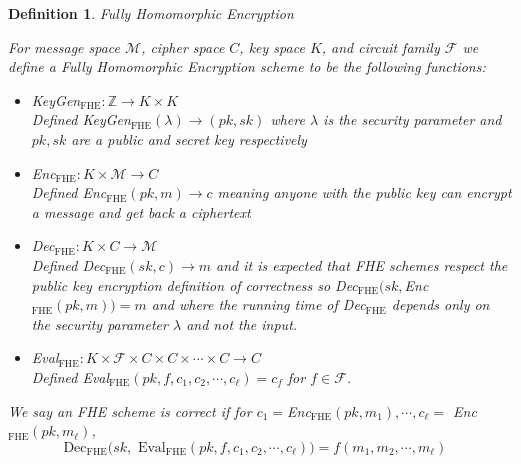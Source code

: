 \documentclass[12pt,twoside]{reedthesis}
\newtheorem{definition}{Definition}
\newcommand{\dec}[0]{\text{Dec}}
\newcommand{\Z}[0]{\mathbb{Z}}
\begin{document}
    \begin{definition}{Fully Homomorphic Encryption}
    \par For message space $\mathcal{M}$, cipher space $C$, key space $K$, and circuit family $\mathcal{F}$ we define a Fully Homomorphic Encryption scheme to be the following functions:
     
     \newcommand{\fhe}[0]{_\text{FHE}}
     
     \begin{itemize}
     \item KeyGen$_\text{FHE}:\Z \to K \times K$ \\
     Defined KeyGen$_\text{FHE}(\lambda)\to (pk,sk)$ where $\lambda$ is the security parameter and $pk,sk$ are a public and secret key respectively 
     \item Enc$_\text{FHE}:K \times \mathcal{M}\to C$ \\
     Defined Enc$_\text{FHE}(pk,m) \to c$ meaning anyone with the public key can encrypt a message and get back a ciphertext
     \item Dec$_\text{FHE}:K \times C \to \mathcal{M}$ \\
     Defined Dec$_\text{FHE}(sk,c) \to m$ and it is expected that FHE schemes respect the public key encryption definition of correctness so Dec$_\text{FHE}(sk,$Enc$_\text{FHE}(pk,m))=m$ and where the running time of Dec$_\text{FHE}$ depends only on the security parameter $\lambda$ and not the input.
     \item Eval$_\text{FHE}:K \times \mathcal{F} \times C \times C \times \cdots \times C \to C$ \\
     Defined Eval$\fhe(pk,f,c_1,c_2,\cdots,c_\ell) = c_f$ for $f\in \mathcal{F}$.
    \end{itemize}
    \par We say an FHE scheme is correct if for $c_1 =$Enc$\fhe(pk,m_1), \cdots, c_\ell =$ Enc$\fhe(pk,m_\ell)$,
    $$\text{$\dec_\text{FHE}(sk,$ Eval$\fhe(pk,f,c_1,c_2, \cdots, c_\ell)) = f(m_1,m_2,\cdots,m_\ell)$ }$$ 
    \end{definition}
    
\end{document}
